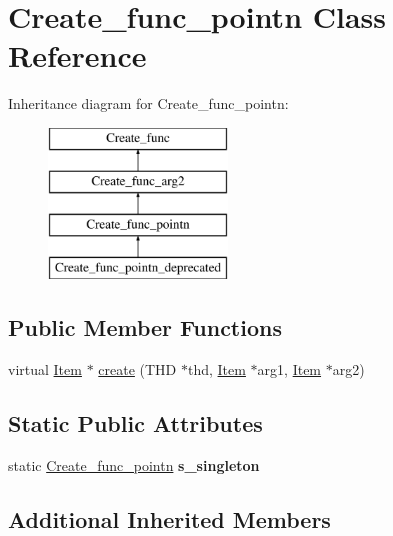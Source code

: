 \hypertarget{classCreate__func__pointn}{}\section{Create\+\_\+func\+\_\+pointn Class Reference}
\label{classCreate__func__pointn}
Inheritance diagram for Create\+\_\+func\+\_\+pointn\+:\begin{figure}[H]
\begin{center}
\leavevmode
\includegraphics[height=4.000000cm]{classCreate__func__pointn}
\end{center}
\end{figure}
\subsection*{Public Member Functions}
\begin{DoxyCompactItemize}
\item 
virtual \mbox{\hyperlink{classItem}{Item}} $\ast$ \mbox{\hyperlink{classCreate__func__pointn_a8747ba76112db31eedbdf89a6c28f2c7}{create}} (T\+HD $\ast$thd, \mbox{\hyperlink{classItem}{Item}} $\ast$arg1, \mbox{\hyperlink{classItem}{Item}} $\ast$arg2)
\end{DoxyCompactItemize}
\subsection*{Static Public Attributes}
\begin{DoxyCompactItemize}
\item 
\mbox{\label{classCreate__func__pointn_ab123ac85acafdb70e17892249b5c2795}} 
static \mbox{\hyperlink{classCreate__func__pointn}{Create\+\_\+func\+\_\+pointn}} {\bfseries s\+\_\+singleton}
\end{DoxyCompactItemize}
\subsection*{Additional Inherited Members}


